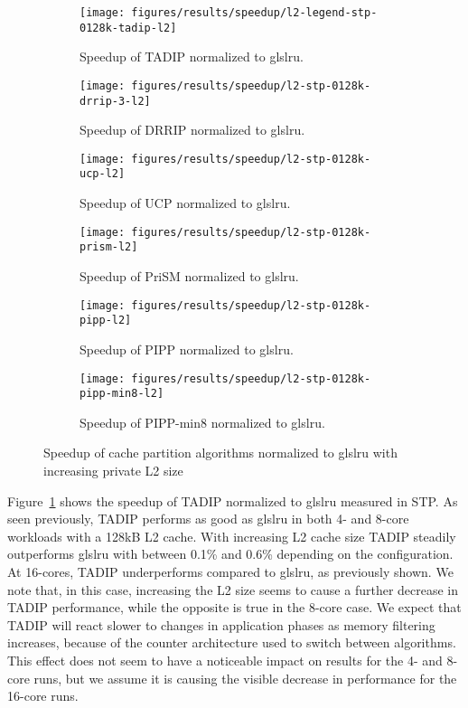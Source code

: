 \begin{figure}[!th]
    \centering
    \begin{subfigure}[b]{0.5\textwidth}
        \texttt{[image: figures/results/speedup/l2-legend-stp-0128k-tadip-l2]}
        \caption{Speedup of TADIP normalized to gls{lru}.}
        \label{fig:results:l2:tadip}
    \end{subfigure}%
    \begin{subfigure}[b]{0.5\textwidth}
        \texttt{[image: figures/results/speedup/l2-stp-0128k-drrip-3-l2]}
        \caption{Speedup of DRRIP normalized to gls{lru}.}
        \label{fig:results:l2:drrip}
    \end{subfigure}
    \begin{subfigure}[b]{0.5\textwidth}
        \texttt{[image: figures/results/speedup/l2-stp-0128k-ucp-l2]}
        \caption{Speedup of UCP normalized to gls{lru}.}
        \label{fig:results:l2:ucp}
    \end{subfigure}%
    \begin{subfigure}[b]{0.5\textwidth}
        \texttt{[image: figures/results/speedup/l2-stp-0128k-prism-l2]}
        \caption{Speedup of PriSM normalized to gls{lru}.}
        \label{fig:results:l2:prism}
    \end{subfigure}
    \begin{subfigure}[b]{0.5\textwidth}
        \texttt{[image: figures/results/speedup/l2-stp-0128k-pipp-l2]}
        \caption{Speedup of PIPP normalized to gls{lru}.}
        \label{fig:results:l2:pipp}
    \end{subfigure}%
    \begin{subfigure}[b]{0.5\textwidth}
        \texttt{[image: figures/results/speedup/l2-stp-0128k-pipp-min8-l2]}
        \caption{Speedup of PIPP-min8 normalized to gls{lru}.}
        \label{fig:results:l2:pipp-min8}
    \end{subfigure}
    \caption[Speedup with increasing L2 size]{Speedup of cache partition algorithms normalized to gls{lru} with increasing private L2 size}
    \label{fig:results:l2}
\end{figure}

Figure~\ref{fig:results:l2:tadip} shows the speedup of TADIP normalized to gls{lru} measured in STP. 
As seen previously, TADIP performs as good as gls{lru} in both 4- and 8-core workloads with a 128kB L2 cache.
With increasing L2 cache size TADIP steadily outperforms gls{lru} with between 0.1\% and 0.6\% depending on the configuration. 
At 16-cores, TADIP underperforms compared to gls{lru}, as previously shown.
We note that, in this case, increasing the L2 size seems to cause a further decrease in TADIP performance, while the opposite is true in the 8-core case.
We expect that TADIP will react slower to changes in application phases as memory filtering increases, because of the counter architecture used to switch between algorithms.
This effect does not seem to have a noticeable impact on results for the 4- and 8-core runs, but we assume it is causing the visible decrease in performance for the 16-core runs.

